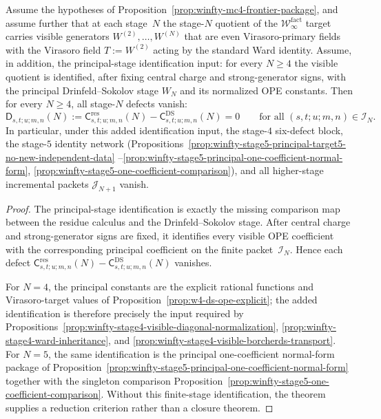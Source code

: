 \begin{theorem}%
\label{thm:winfty-all-stages-rigidity-closure}%
%
%
Assume the hypotheses of
Proposition~\textup{\ref{prop:winfty-mc4-frontier-package}}, and assume
further that at each stage~$N$ the stage-$N$ quotient of the
$\mathcal{W}_\infty^{\mathrm{fact}}$ target carries visible generators
$W^{(2)},\ldots,W^{(N)}$ that are even Virasoro-primary fields with
the Virasoro field $T:=W^{(2)}$ acting by the standard Ward identity.
Assume, in addition, the principal-stage identification input:
for every $N\ge4$ the visible quotient is identified, after fixing
central charge and strong-generator signs, with the principal
Drinfeld--Sokolov stage $W_N$ and its normalized OPE constants.
Then for every $N \ge 4$, all stage-$N$ defects vanish:
\[
\mathsf{D}_{s,t;u;m,n}(N)
:=
\mathsf{C}^{\mathrm{res}}_{s,t;u;m,n}(N)
-
\mathsf{C}^{\mathrm{DS}}_{s,t;u;m,n}(N)
=
0
\qquad
\text{for all $(s,t;u;m,n) \in \mathcal{I}_N$.}
\]
In particular, under this added identification input, the stage-$4$
six-defect block, the stage-$5$
identity network
\textup{(}Propositions~\textup{\ref{prop:winfty-stage5-principal-target5-no-new-independent-data}}%
--\textup{\ref{prop:winfty-stage5-principal-one-coefficient-normal-form}},
\textup{\ref{prop:winfty-stage5-one-coefficient-comparison}}\textup{)},
and all higher-stage incremental packets $\mathcal{J}_{N+1}$ vanish.
\end{theorem}

\begin{proof}
The principal-stage identification is exactly the missing comparison
map between the residue calculus and the Drinfeld--Sokolov stage.
After central charge and strong-generator signs are fixed, it
identifies every visible OPE coefficient with the corresponding
principal coefficient on the finite packet~$\mathcal{I}_N$. Hence each
defect
\(\mathsf{C}^{\mathrm{res}}_{s,t;u;m,n}(N)
-\mathsf{C}^{\mathrm{DS}}_{s,t;u;m,n}(N)\)
vanishes.

For \(N=4\), the principal constants are the explicit rational
functions and Virasoro-target values of
Proposition~\ref{prop:w4-ds-ope-explicit}; the added identification is
therefore precisely the input required by
Propositions~\ref{prop:winfty-stage4-visible-diagonal-normalization},
\ref{prop:winfty-stage4-ward-inheritance}, and
\ref{prop:winfty-stage4-visible-borcherds-transport}. For \(N=5\),
the same identification is the principal one-coefficient normal-form
package of
Proposition~\ref{prop:winfty-stage5-principal-one-coefficient-normal-form}
together with the singleton comparison
Proposition~\ref{prop:winfty-stage5-one-coefficient-comparison}.
Without this finite-stage identification, the theorem supplies a
reduction criterion rather than a closure theorem.
\end{proof}

